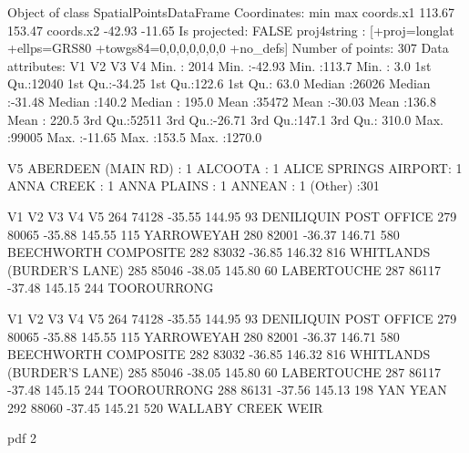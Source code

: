 \documentclass[a4paper]{article}                %
\begin{document}



\begin{Schunk}
\begin{Soutput}
Object of class SpatialPointsDataFrame
Coordinates:
             min    max
coords.x1 113.67 153.47
coords.x2 -42.93 -11.65
Is projected: FALSE 
proj4string :
[+proj=longlat +ellps=GRS80 +towgs84=0,0,0,0,0,0,0 +no_defs]
Number of points: 307
Data attributes:
       V1              V2               V3              V4        
 Min.   : 2014   Min.   :-42.93   Min.   :113.7   Min.   :   3.0  
 1st Qu.:12040   1st Qu.:-34.25   1st Qu.:122.6   1st Qu.:  63.0  
 Median :26026   Median :-31.48   Median :140.2   Median : 195.0  
 Mean   :35472   Mean   :-30.03   Mean   :136.8   Mean   : 220.5  
 3rd Qu.:52511   3rd Qu.:-26.71   3rd Qu.:147.1   3rd Qu.: 310.0  
 Max.   :99005   Max.   :-11.65   Max.   :153.5   Max.   :1270.0  
                                                                  
                     V5     
 ABERDEEN (MAIN RD)   :  1  
 ALCOOTA              :  1  
 ALICE SPRINGS AIRPORT:  1  
 ANNA CREEK           :  1  
 ANNA PLAINS          :  1  
 ANNEAN               :  1  
 (Other)              :301  
\end{Soutput}
\begin{Soutput}
       V1     V2     V3  V4                        V5
264 74128 -35.55 144.95  93    DENILIQUIN POST OFFICE
279 80065 -35.88 145.55 115                YARROWEYAH
280 82001 -36.37 146.71 580      BEECHWORTH COMPOSITE
282 83032 -36.85 146.32 816 WHITLANDS (BURDER'S LANE)
285 85046 -38.05 145.80  60               LABERTOUCHE
287 86117 -37.48 145.15 244               TOOROURRONG
\end{Soutput}
\begin{Soutput}
       V1     V2     V3  V4                        V5
264 74128 -35.55 144.95  93    DENILIQUIN POST OFFICE
279 80065 -35.88 145.55 115                YARROWEYAH
280 82001 -36.37 146.71 580      BEECHWORTH COMPOSITE
282 83032 -36.85 146.32 816 WHITLANDS (BURDER'S LANE)
285 85046 -38.05 145.80  60               LABERTOUCHE
287 86117 -37.48 145.15 244               TOOROURRONG
288 86131 -37.56 145.13 198                  YAN YEAN
292 88060 -37.45 145.21 520        WALLABY CREEK WEIR
\end{Soutput}
\begin{Soutput}
pdf 
  2 
\end{Soutput}
\end{Schunk}
\end{document}
